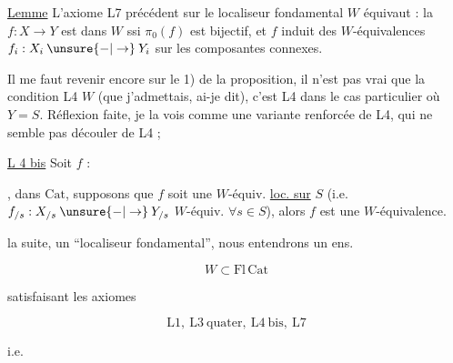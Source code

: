\uline{Lemme} L'axiome L7 précédent sur le localiseur fondamental $W$ équivaut : la   $f:X\longrightarrow Y$  est dans $W$ ssi $\pi_0(f)$ est bijectif, et  $f$ induit des $W$-équivalences $f_i:X_i\mathbin{\unsure{-|\to}}Y_i$ sur les composantes connexes.

Il me faut revenir encore sur le 1) de la proposition, il n'est pas vrai que   la condition L4  $W$ (que j'admettais, ai-je dit), c'est L4 dans le cas particulier où $Y=S$. Réflexion faite, je la vois comme une variante renforcée de L4, qui ne semble pas  découler de L4 ; 

\uline{L 4 bis} Soit $f$ :


,  dans $\mathrm{Cat}$, supposons que  $f$ soit une $W$-équiv. \uline{loc. sur} $S$ (i.e. $f_{/s}:X_{/s}\mathbin{\unsure{-|\to}}Y_{/s}$  $W$-équiv. $\forall s\in S$), alors $f$ est une $W$-équivalence.


 la suite,  un ``localiseur fondamental'', nous entendrons un ens.

\[
 W\subset\mathrm{Fl}\,\mathrm{Cat}
\]

satisfaisant  les axiomes

\[
 \mathrm L1,\ \mathrm L3\ \text{quater},\ \mathrm L4\ \text{bis},\ \mathrm L7
\]

i.e. 

